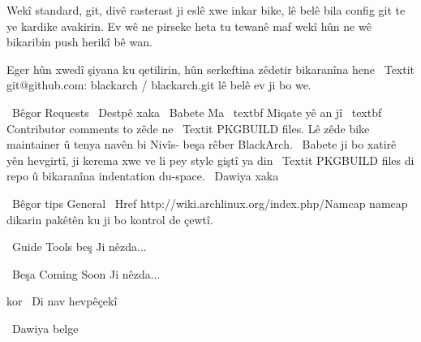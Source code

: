 Wekî standard, git, divê rasterast ji eslê xwe inkar bike, lê belê bila config git te ye
kardike avakirin. Ev wê ne pirseke heta tu tewanê maf wekî
hûn ne wê bikaribin push herikî bê wan.

Eger hûn xwedî şiyana ku qetilirin, hûn serkeftina zêdetir bikaranîna hene
\ Textit {git@github.com: blackarch / blackarch.git} lê belê ev ji bo we.

\ Bêgor {Requests}
\ Destpê {xaka}
\ Babete Ma \ textbf {Miqate yê} an jî \ textbf {Contributor} comments to zêde ne
\ Textit {PKGBUILD} files. Lê zêde bike maintainer û tenya navên bi
Nivîs- beşa rêber BlackArch.
\ Babete ji bo xatirê yên hevgirtî, ji kerema xwe ve li pey style giştî ya din
\ Textit {PKGBUILD} files di repo û bikaranîna indentation du-space.
\ Dawiya {xaka}

\ Bêgor {tips General}
\ Href {http://wiki.archlinux.org/index.php/Namcap} {namcap} dikarin pakêtên ku ji bo kontrol
de çewtî.


\ {Guide Tools} beş
Ji nêzda...

\ Beşa {Coming Soon}
Ji nêzda...

 kor
\ Di nav {hevpêçekî}

\ Dawiya {belge}

